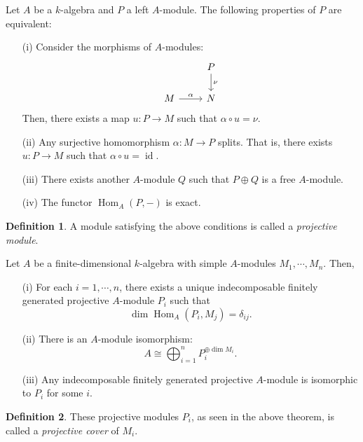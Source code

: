 \documentclass[a4paper]{report}
\theoremstyle{definition}
\newtheorem{definition}{Definition}
\theoremstyle{remark}
\theoremstyle{proposition}
\theoremstyle{conjecture}
\theoremstyle{lemma}
\theoremstyle{corollary}
\theoremstyle{exercise}
\theoremstyle{example}
\newcommand{\on}{\operatorname}
\begin{document}
\begin{theorem}
    Let $A$ be a $k$-algebra and $P$ a left $A$-module. The following properties
    of $P$ are equivalent:
    \begin{itemize}
        \item[(i)] Consider the morphisms of $A$-modules: 
            $$\begin{tikzcd}
                        & P \arrow[d, "\nu"] \\
  M \arrow[r, "\alpha"] & N                 
  \end{tikzcd}$$ 
            Then, there exists a map $u : P \to M$ such that 
            $\alpha \circ u = \nu$.
        \item[(ii)]
            Any surjective homomorphism $\alpha : M \to P$ splits. 
            That is, there exists $u : P \to M$ such that 
            $\alpha \circ u = \on{id}$.
        \item[(iii)] There exists another $A$-module $Q$ such that 
            $P\oplus Q$ is a free $A$-module.
        \item[(iv)] The functor $\on{Hom}_A(P,-)$ is exact.
    \end{itemize}
\end{theorem}

\begin{definition}
    A module satisfying the above conditions is called a \emph{projective 
    module}.
\end{definition}

\begin{theorem}\label{thm34}
    Let $A$ be a finite-dimensional $k$-algebra with simple $A$-modules 
    $M_1,\cdots, M_n$. Then,
    \begin{itemize}
        \item[(i)] For each $i=1,\cdots,n$, there exists a unique indecomposable
            finitely generated projective $A$-module $P_i$ such that 
            $$\dim \on{Hom}_A(P_i,M_j) = \delta_{ij}.$$
        \item[(ii)] There is an $A$-module isomorphism:
            $$A \cong \bigoplus_{i=1}^n P_i^{\oplus \dim M_i}.$$
        \item[(iii)] Any indecomposable finitely generated 
            projective $A$-module is isomorphic to $P_i$ for some $i$.
    \end{itemize}
\end{theorem}

\begin{definition}
    These projective modules $P_i$, as seen in the above theorem, is called a 
    \emph{projective cover} of $M_i$. 
\end{definition}
\end{document}
